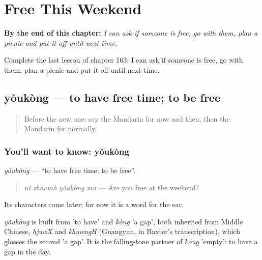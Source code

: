 
\chapter{Free This Weekend}
\label{ch:zh-free-this-weekend}

\begin{chapteropening}
\textbf{By the end of this chapter:} \emph{I can ask if someone is free, go with them, plan a picnic and put it off until next time.}

Complete the last lesson of chapter 163: I can ask if someone is free, go with them, plan a picnic and put it off until next time.
\end{chapteropening}

\section[yǒukòng]{yǒukòng — to have free time; to be free}

\label{lesson:ZH-C163-youkong}



\begin{quote}
Before the new one: say the Mandarin for now and then, then the Mandarin for normally.
\end{quote}

\subsection*{You'll want to know: yǒukòng}
\emph{yǒukòng} — \textquotedblleft{}to have free time; to be free\textquotedblright{}.

\begin{quote}
\emph{nǐ zhōumò yǒukòng ma} — Are you free at the weekend?
\end{quote}

Its characters come later; for now it is a word for the ear.

\begin{cousinweb}
\emph{yǒukòng} is built from  'to have' and \emph{kòng} 'a gap', both inherited from Middle Chinese, \emph{hjuwX} and \emph{khuwngH} (Guangyun, in Baxter's transcription), which glosses the second 'a gap'. It is the falling-tone partner of \emph{kōng} 'empty': to have a gap in the day.
\end{cousinweb}


